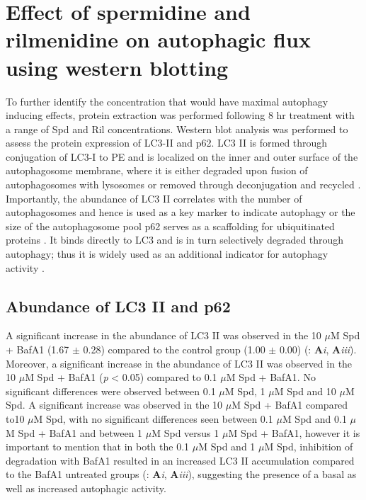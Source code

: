 {\section{Effect of spermidine and rilmenidine on autophagic flux using western blotting}
To further identify the concentration that would have maximal autophagy inducing effects, protein extraction was performed following 8 hr treatment with a range of Spd and Ril concentrations. Western blot analysis was performed to assess the protein expression of LC3-II and p62. LC3 II is formed through conjugation of LC3-I to PE and is localized on the inner and outer surface of the autophagosome membrane, where it is either degraded upon fusion of autophagosomes with lysosomes or removed through deconjugation and recycled \citep{kabeya2000}. Importantly, the abundance of LC3 II correlates with the number of autophagosomes and hence is used as a key marker to indicate autophagy or the size of the autophagosome pool \citep{loos2014} p62 serves as a scaffolding for ubiquitinated proteins \citep{sahani2014}. It binds directly to LC3 and is in turn selectively degraded through autophagy; thus it is widely used as an additional indicator for autophagy activity \citep{pankiv2007}.

\subsection{Abundance of LC3 II and p62}
A significant increase in the abundance of LC3 II was observed in the 10 $\mu$M Spd + BafA1 (1.67 $\pm$ 0.28) compared to the control group (1.00 $\pm$ 0.00) (: \textbf{A}\textit{i}, \textbf{A}\textit{iii}). Moreover, a significant increase in the abundance of LC3 II was observed in the 10 $\mu$M Spd + BafA1 (\textit{p} < 0.05) compared to 0.1 $\mu$M Spd + BafA1. No significant differences were observed between 0.1 $\mu$M Spd, 1 $\mu$M Spd and 10 $\mu$M Spd. A significant increase was observed in the 10 $\mu$M Spd + BafA1 compared to10 $\mu$M Spd, with no significant differences seen between 0.1 $\mu$M Spd and 0.1 $\mu$M Spd + BafA1 and between 1 $\mu$M Spd versus 1 $\mu$M Spd + BafA1, however it is important to mention that in both the 0.1 $\mu$M Spd  and 1 $\mu$M Spd, inhibition of degradation with BafA1 resulted in an increased LC3 II accumulation compared to the BafA1 untreated groups (: \textbf{A}\textit{i}, \textbf{A}\textit{iii}), suggesting the presence of a basal as well as increased autophagic activity.

}
